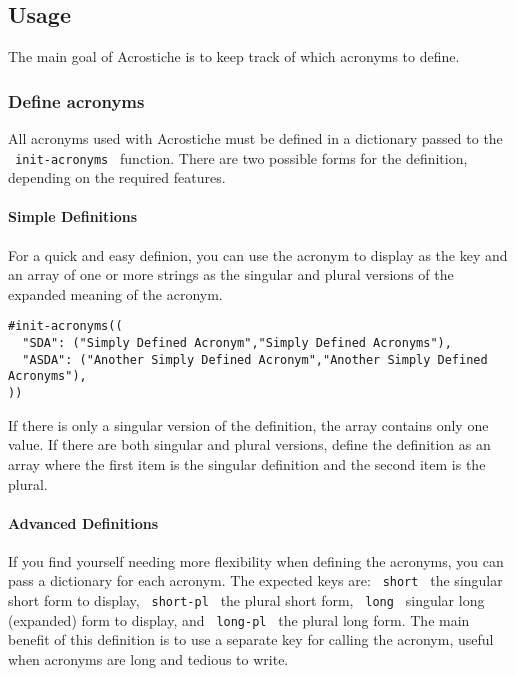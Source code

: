 \subsection{Usage}\label{usage}

The main goal of Acrostiche is to keep track of which acronyms to
define.

\subsubsection{Define acronyms}\label{define-acronyms}

All acronyms used with Acrostiche must be defined in a dictionary passed
to the \texttt{\ init-acronyms\ } function. There are two possible forms
for the definition, depending on the required features.

\paragraph{Simple Definitions}\label{simple-definitions}

For a quick and easy definion, you can use the acronym to display as the
key and an array of one or more strings as the singular and plural
versions of the expanded meaning of the acronym.

\begin{verbatim}
#init-acronyms((
  "SDA": ("Simply Defined Acronym","Simply Defined Acronyms"),
  "ASDA": ("Another Simply Defined Acronym","Another Simply Defined Acronyms"),
))
\end{verbatim}

If there is only a singular version of the definition, the array
contains only one value. If there are both singular and plural versions,
define the definition as an array where the first item is the singular
definition and the second item is the plural.

\paragraph{Advanced Definitions}\label{advanced-definitions}

If you find yourself needing more flexibility when defining the
acronyms, you can pass a dictionary for each acronym. The expected keys
are: \texttt{\ short\ } the singular short form to display,
\texttt{\ short-pl\ } the plural short form, \texttt{\ long\ } singular
long (expanded) form to display, and \texttt{\ long-pl\ } the plural
long form. The main benefit of this definition is to use a separate key
for calling the acronym, useful when acronyms are long and tedious to
write.

